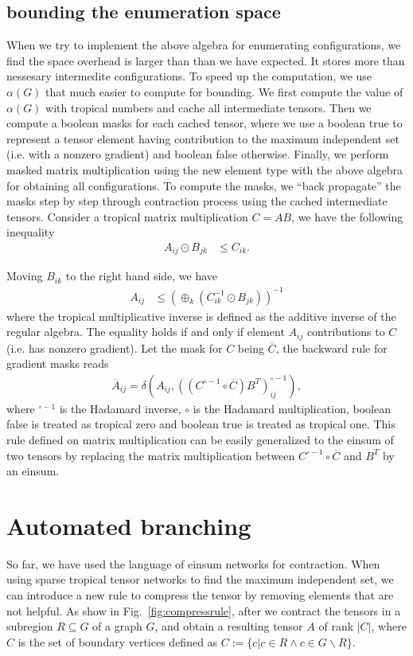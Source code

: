 \documentclass{article}
\newcommand{\<}{\langle}
\renewcommand{\>}{\rangle}
\newcommand{\Fig}[1]{Fig.~\ref{#1}}
\theoremstyle{definition}\newtheorem{definition}{\textit{Definition}}
\begin{document}
\subsection{bounding the enumeration space}
When we try to implement the above algebra for enumerating configurations, we find the space overhead is larger than than we have expected.
It stores more than nessesary intermedite configurations. To speed up the computation, we use $\alpha(G)$ that much easier to compute for bounding.
We first compute the value of $\alpha(G)$ with tropical numbers and cache all intermediate tensors.
Then we compute a boolean masks for each cached tensor, where we use a boolean true to represent a tensor element having contribution to the maximum independent set (i.e. with a nonzero gradient) and boolean false otherwise.
Finally, we perform masked matrix multiplication using the new element type with the above algebra for obtaining all configurations.
To compute the masks, we ``back propagate'' the masks step by step through contraction process using the cached intermediate tensors.
Consider a tropical matrix multiplication $C = A B$, we have the following inequality
\begin{align}
    A_{ij} \odot B_{jk} &\leq C_{ik}.
\end{align}

Moving $B_{ik}$ to the right hand side, we have
\begin{align}
    A_{ij} &\leq (\oplus_{k} (C_{ik}^{-1} \odot B_{jk}))^{-1}
\end{align}
where the tropical multiplicative inverse is defined as the additive inverse of the regular algebra. The equality holds if and only if element $A_{ij}$ contributions to $C$ (i.e. has nonzero gradient).
Let the mask for $C$ being $\overline C$, the backward rule for gradient masks reads
\begin{align}
\overline{A}_{ij} = \delta(A_{ij}, ((C^{\circ-1} \circ \overline C )B^T)_{ij}^{\circ -1}),
\end{align}
where ${}^{\circ -1}$ is the Hadamard inverse, $\circ$ is the Hadamard multiplication, boolean false is treated as tropical zero and boolean true is treated as tropical one.
This rule defined on matrix multiplication can be easily generalized to the einsum of two tensors by replacing the matrix multiplication between $C^{\circ-1} \circ \overline C$ and $B^T$ by an einsum.

\section{Automated branching}
So far, we have used the language of einsum networks for contraction.
When using sparse tropical tensor networks to find the maximum independent set, we can introduce a new rule to compress the tensor by removing elements that are not helpful.
As show in \Fig{fig:compressrule}, after we contract the tensors in a subregion $R \subseteq G$ of a graph $G$, and obtain a resulting tensor $A$ of rank $|C|$, where $C$ is the set of boundary vertices defined as $C := \{c | c\in R \land c \in G\backslash R\}$.
\end{document}
